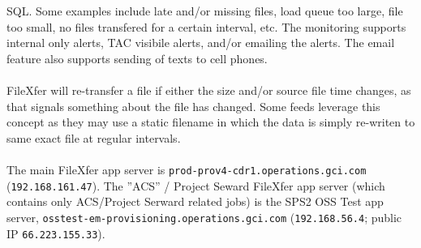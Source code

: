 SQL.  Some examples include late and/or missing files, load
queue too large, file too small, no files transfered for a
certain interval, etc.  The monitoring supports internal
only alerts, TAC visibile alerts, and/or emailing the alerts.
The email feature also supports sending of texts to cell
phones.\\
\\
FileXfer will re-transfer a file if either the size and/or
source file time changes, as that signals something about the
file has changed.  Some feeds leverage this concept as they
may use a static filename in which the data is simply re-writen
to same exact file at regular intervals.\\
\\
The main FileXfer app server is
\texttt{prod-prov4-cdr1.operations.gci.com}
(\texttt{192.168.161.47}).  The ''ACS'' / Project Seward
FileXfer app server (which contains only ACS/Project
Serward related jobs) is the SPS2 OSS Test app server,
\texttt{osstest-em-provisioning.operations.gci.com}
(\texttt{192.168.56.4}; public IP \texttt{66.223.155.33}).



